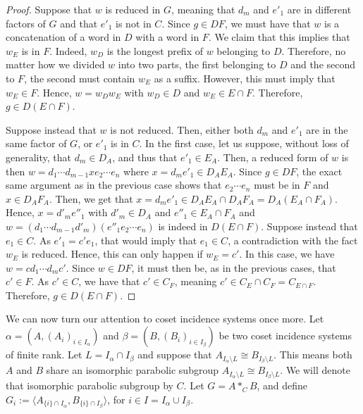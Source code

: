 \documentclass[11pt,letterpaper]{amsart}
\begin{document}
\begin{proof}
Suppose that $w$ is reduced in $G$, meaning that $d_m$ and $e'_1$ are in different factors of $G$ and that $e'_1$ is not in $C$. Since $g \in DF$, we must have that $w$ is a concatenation of a word in $D$ with a word in $F$. We claim that this implies that $w_E$ is in $F$. Indeed, $w_D$ is the longest prefix of $w$ belonging to $D$. Therefore, no matter how we divided $w$ into two parts, the first belonging to $D$ and the second to $F$, the second must contain $w_E$ as a suffix. However, this must imply that $w_E \in F$. Hence, $w = w_D w_E$ with $w_D \in D$ and $w_E \in E \cap F$. Therefore, $g \in D(E \cap F)$.

    Suppose instead that $w$ is not reduced. Then, either both $d_m$ and $e'_1$ are in the same factor of $G$, or $e'_1$ is in $C$. In the first case, let us suppose, without loss of generality, that $d_m \in D_A$, and thus that $e'_1 \in E_A$. Then, a reduced form of $w$ is then $w = d_1 \cdots d_{m-1} x e_{2} \cdots e_n$ where $x = d_m e'_1 \in D_A E_A$. 
    Since $g \in DF$, the exact same argument as in the previous case shows that $e_2 \cdots e_n$ must be in $F$ and $x\in D_AF_A$. Then, we get that $x = d_m e'_1 \in D_A E_A \cap D_A F_A = D_A(E_A \cap F_A)$. Hence, $x = d'_m e''_1$ with $d'_m \in D_A$ and $e''_1 \in E_A \cap F_A$ and $w =  (d_1 \cdots d_{m-1} d'_m) (e''_1 e_{2} \cdots e_n)$ is indeed in $D(E \cap F)$. Suppose instead that $e_1 \in C$. 
    As $e'_1=c'e_1$, that would imply that $e_1\in C$, a contradiction with the fact $w_E$ is reduced. Hence, this can only happen if $w_E=c'$.
    In this case, 
     we have $w = c d_1 \cdots d_m c'$. Since $w \in DF$, it must then be, as in the previous cases, that $c' \in F$. As $c'\in C$, we have that $c' \in C_F$, meaning $c'\in C_E\cap C_F= C_{E\cap F}$.
    Therefore, $g \in D(E\cap F)$.
\end{proof}



We can now turn our attention to coset incidence systems once more. Let $\alpha = (A, (A_i)_{i \in I_\alpha})$ and $ \beta =(B, (B_i)_{i \in I_\beta})$ be two coset incidence systems of finite rank. Let $L = I_\alpha \cap I_\beta$ and suppose that $A_{I_\alpha \setminus L} \cong B_{I_\beta \setminus L}$. This means both $A$ and $B$ share an isomorphic parabolic subgroup  $A_{I_\alpha \setminus L} \cong B_{I_\beta \setminus L}$. We will denote that isomorphic parabolic subgroup by $C$. Let $G = A *_{C} B$, and define $G_i := \langle A_{\{i\} \cap I_\alpha} , B_{ \{i\} \cap I_\beta}\rangle$, for $i\in I = I_\alpha\cup I_\beta$.  
\end{document}
